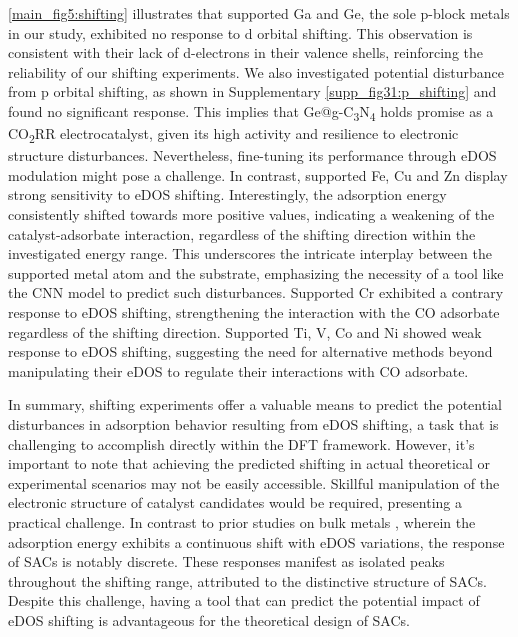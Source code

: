 \documentclass[a4paper, 12pt, titlepage]{article}
\begin{document}
    \cref{main_fig5:shifting} illustrates that supported Ga and Ge, the sole p-block metals in our study,
    exhibited no response to d orbital shifting.
    This observation is consistent with their lack of d-electrons in their valence shells,
    reinforcing the reliability of our shifting experiments.
    We also investigated potential disturbance from p orbital shifting,
    as shown in Supplementary \cref{supp_fig31:p_shifting} and found no significant response.
    This implies that Ge@g-C\textsubscript{3}N\textsubscript{4} holds promise as a CO\textsubscript{2}RR electrocatalyst,
    given its high activity and resilience to electronic structure disturbances.
    Nevertheless, fine-tuning its performance through eDOS modulation might pose a challenge.
    In contrast, supported Fe, Cu and Zn display strong sensitivity to eDOS shifting.
    Interestingly, the adsorption energy consistently shifted towards more positive values,
    indicating a weakening of the catalyst-adsorbate interaction,
    regardless of the shifting direction within the investigated energy range.
    This underscores the intricate interplay between the supported metal atom and the substrate,
    emphasizing the necessity of a tool like the CNN model to predict such disturbances.
    Supported Cr exhibited a contrary response to eDOS shifting, strengthening the
    interaction with the CO adsorbate regardless of the shifting direction.
    Supported Ti, V, Co and Ni showed weak response to eDOS shifting,
    suggesting the need for alternative methods beyond manipulating their eDOS
    to regulate their interactions with CO adsorbate.

    In summary, shifting experiments offer a valuable means to predict the potential
    disturbances in adsorption behavior resulting from eDOS shifting,
    a task that is challenging to accomplish directly within the DFT framework.
    However, it's important to note that achieving the predicted shifting
    in actual theoretical or experimental scenarios may not be easily accessible.
    Skillful manipulation of the electronic structure of catalyst candidates would be required,
    presenting a practical challenge.
    In contrast to prior studies on bulk metals \cite{fung2021machine},
    wherein the adsorption energy exhibits a continuous shift with eDOS variations,
    the response of SACs is notably discrete.
    These responses manifest as isolated peaks throughout the shifting range,
    attributed to the distinctive structure of SACs.
    Despite this challenge, having a tool that can predict the potential impact of
    eDOS shifting is advantageous for the theoretical design of SACs.
\end{document}

